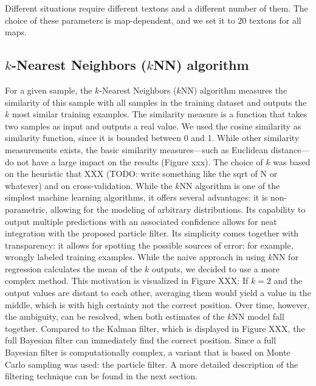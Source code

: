 Different situations require different textons and a different number
of them. The choice of these parameters is map-dependent, and we set
it to 20 textons for all maps.



\subsection{$k$-Nearest Neighbors ($k$NN) algorithm}


For a given sample, the $k$-Nearest Neighbors ($k$NN) algorithm measures the similarity of this sample with all samples in the training dataset and outputs the $k$ most similar training examples. The similarity measure is a function that takes two samples as input and outputs a real value. We used the cosine similarity as similarity function, since it is bounded between 0 and 1. While other similarity measurements exists, the basic similarity measures—such as Euclidean distance—do not have a large impact on the results (Figure xxx). The choice of $k$ was based on the heuristic that XXX (TODO: write something like the sqrt of N or whatever) and on cross-validation.  
While the $k$NN algorithm is one of the simplest machine learning algorithms, it
offers several advantages: it is non-parametric, allowing for the
modeling of arbitrary distributions. Its capability to output multiple
predictions with an associated confidence allows for neat integration
with the proposed particle filter. Its simplicity comes together with transparency: it allows for spotting the possible sources of error: for example, wrongly labeled training examples. While the naive approach in using $k$NN for regression calculates the mean of the $k$ outputs, we decided to use a more complex method. This motivation is visualized in Figure XXX: If $k=2$ and the output values are distant to each other, averaging them would yield a value in the middle, which is with high certainty not the correct position. Over time, however, the ambiguity, can be resolved, when both estimates of the $k$NN model fall together. Compared to the Kalman filter, which is displayed in Figure XXX, the full Bayesian filter can immediately find the correct position. Since a full Bayesian filter is computationally complex, a variant that is based on Monte Carlo sampling was used: the particle filter. A more detailed description of the filtering technique can be found in the next section.  

